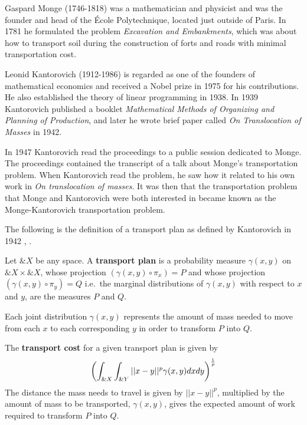 Gaspard Monge (1746-1818) was a mathematician and physicist and was
the founder and head of the \'Ecole Polytechnique, located just
outside of Paris. In 1781 he formulated the problem \textit{Excavation
  and Embankments}, which was about how to transport soil during the
construction of forts and roads with minimal transportation cost.

Leonid Kantorovich (1912-1986) is regarded as one of the founders of
mathematical economics and received a Nobel prize in 1975 for his
contributions.  He also established the theory of linear programming
in 1938. In 1939 Kantorovich published a booklet \textit{Mathematical
  Methods of Organizing and Planning of Production}, and later he wrote
brief paper called \textit{On Translocation of Masses} in 1942.

In 1947 Kantorovich read the proceedings to a public session dedicated
to Monge.  The proceedings contained the transcript of a talk about
Monge's transportation problem. When Kantorovich read the problem, he
saw how it related to his own work in \textit{On translocation of
  masses}. It was then that the transportation problem that Monge and
Kantorovich were both interested in became known as the
Monge-Kantorovich transportation problem.

The following is the definition of a transport plan as defined by
Kantorovich in 1942 \cite{ref:kantorovich-1942},
\cite{ref:vershik-2013}.

\begin{definition}
  Let $\&X$ be any space. A \textbf{transport plan} is a probability
  measure $\gamma(x, y)$ on $\&X \times \&X$, whose projection
  $(\gamma(x, y) \circ \pi_{x}) = P$ and whose projection
  $(\gamma(x, y) \circ \pi_{y}) = Q$ i.e.\ the marginal distributions
  of $\gamma(x, y)$ with respect to $x$ and $y$, are the measures $P$
  and $Q$.
\end{definition}

\begin{remark}
  Each joint distribution $\gamma(x, y)$ represents the amount of mass
  needed to move from each $x$ to each corresponding $y$ in order to
  transform $P$ into $Q$.
\end{remark}

\begin{definition}
  The \textbf{transport cost} for a given transport plan is given by
  \begin{align}
    \label{eq:expected-work}
    \left(\int_{\&X}\int_{\&Y}||x-y||^p\gamma(x, y)dxdy \right)^{1 \over p}
  \end{align}
  The distance the mass needs to travel is given by $||x-y||^p$,
  multiplied by the amount of mass to be transported, $\gamma(x, y)$,
  gives the expected amount of work required to transform $P$ into
  $Q$.
\end{definition}

